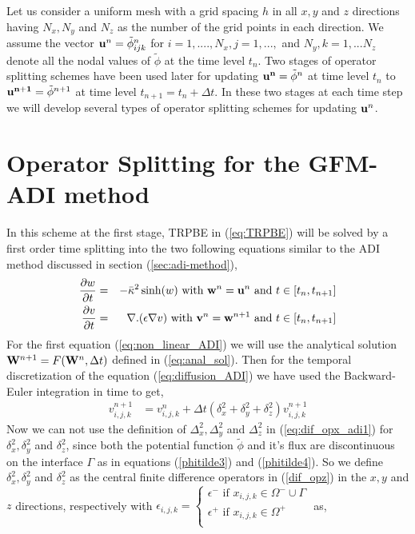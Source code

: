 Let us consider a uniform mesh with a grid spacing $h$ in all $x,y$ and $z$ directions having $N_x,N_y$ and $N_z$ as the number of the grid points in each direction. We assume the vector ${{\bf u}^n = \tilde \phi^n_{ijk}}$ for $i=1,...., N_x,j=1,...,$ and $N_y,k=1,...N_z$ denote all the nodal values of $\tilde \phi$ at the time level $t_n$. Two stages of operator splitting schemes have been used later for updating ${\bf u^n}=\tilde \phi^n$ at time level $t_n$ to ${\bf u^{n+1}}=\tilde \phi^{n+1}$ at time level $t_{n+1}=t_n+ \Delta t $. In these two stages at each time step we will develop several types of operator splitting schemes for updating ${\bf u}^n$. 
\section{Operator Splitting for the GFM-ADI method}
\label{sec:GFM-ADI}

In this scheme at the first stage, TRPBE in  (\ref{eq:TRPBE}) will be solved by a first order time splitting into the two following equations similar to the ADI method discussed in section (\ref{sec:adi-method}), 
\begin{eqnarray}
  \frac{\partial w}{\partial t}&=& -\bar\kappa^2 \sinh(w) \text{ with } {\bf w}^n={\bf u}^n\text{ and } t \in \left[t_n,t_{n+1}\right]\label{eq:non_linear_ADI}\\
 \frac{\partial v}{\partial t}&=&  \nabla . (\epsilon\nabla v) \text{ with } {\bf v}^n={\bf w}^{n+1}\text{ and } t \in \left[t_n,t_{n+1}\right]	 \label{eq:diffusion_ADI}
\end{eqnarray}  
For the first equation (\ref{eq:non_linear_ADI}) we will use the analytical solution ${\bf W}^{n+1}=F({\bf W}^n,\Delta t)$ defined in (\ref{eq:anal_sol}). Then for the temporal discretization of the equation (\ref{eq:diffusion_ADI}) we have used the Backward-Euler integration in time to get, 
\begin{eqnarray}
	v_{i,j,k}^{n+1} &=v_{i,j,k}^{n}+\Delta t \left(\delta_x^2+\delta_y^2+\delta_z^2\right)v_{i,j,k}^{n+1} \label{eq:imp-eu}
\end{eqnarray}	
Now we can not use the definition of $\Delta_x^2,\Delta_y^2$ and $\Delta_z^2$ in (\ref {eq:dif_opx_adi1}) for $\delta_x^2,\delta_y^2$ and $\delta_z^2$, since both the potential function $\tilde \phi$ and it's flux are discontinuous on the interface $\Gamma$ as in equations (\ref{phitilde3}) and (\ref{phitilde4}). So we define $\delta_x^2,\delta_y^2$ and $\delta_z^2$ as the central finite difference operators in (\ref{dif_opz}) in the $x,y$ and $z$ directions, respectively with $\epsilon_{i,j,k}= \displaystyle\begin{cases}
	\epsilon^- \text{ if } x_{i,j,k}\in\Omega^- \cup \Gamma \\
	\epsilon^+ \text{ if } x_{i,j,k}\in\Omega^+\\
	\end{cases}$ as,

